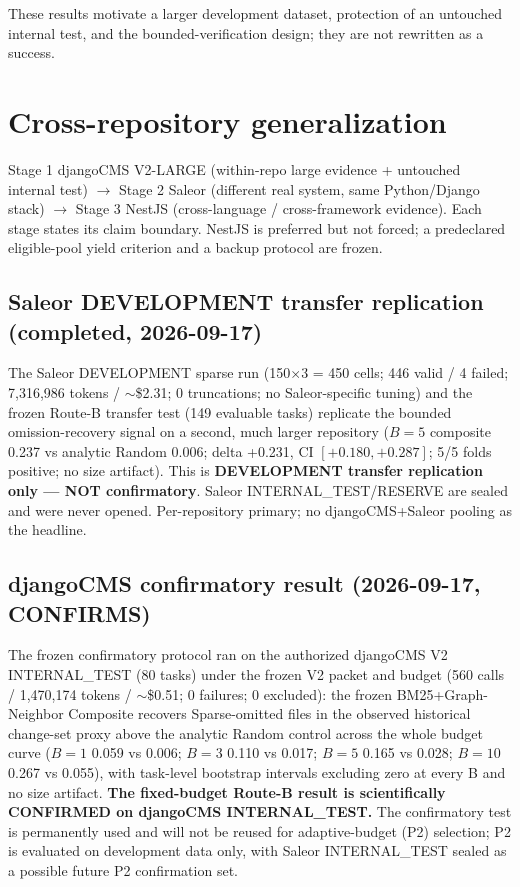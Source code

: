 \documentclass[11pt,a4paper]{article}
\begin{document}
These results motivate a larger development dataset, protection of an untouched
internal test, and the bounded-verification design; they are not rewritten as a
success.

\section{Cross-repository generalization}
\label{sec:gen}

Stage 1 djangoCMS V2-LARGE (within-repo large evidence + untouched internal
test) $\to$ Stage 2 Saleor (different real system, same Python/Django stack)
$\to$ Stage 3 NestJS (cross-language / cross-framework evidence). Each stage
states its claim boundary. NestJS is preferred but not forced; a predeclared
eligible-pool yield criterion and a backup protocol are frozen.

\subsection{Saleor DEVELOPMENT transfer replication (completed, 2026-09-17)}
The Saleor DEVELOPMENT sparse run (150$\times$3 = 450 cells; 446 valid / 4
failed; 7,316,986 tokens / $\sim$\$2.31; 0 truncations; no Saleor-specific
tuning) and the frozen Route-B transfer test (149 evaluable tasks) replicate
the bounded omission-recovery signal on a second, much larger repository
($B{=}5$ composite 0.237 vs analytic Random 0.006; delta +0.231, CI
$[+0.180,+0.287]$; 5/5 folds positive; no size artifact). This is
\textbf{DEVELOPMENT transfer replication only --- NOT confirmatory}. Saleor
INTERNAL\_TEST/RESERVE are sealed and were never opened. Per-repository primary;
no djangoCMS+Saleor pooling as the headline.

\subsection{djangoCMS confirmatory result (2026-09-17, CONFIRMS)}
The frozen confirmatory protocol ran on the authorized djangoCMS V2
INTERNAL\_TEST (80 tasks) under the frozen V2 packet and budget (560 calls /
1,470,174 tokens / $\sim$\$0.51; 0 failures; 0 excluded): the frozen
BM25+Graph-Neighbor Composite recovers Sparse-omitted files in the observed
historical change-set proxy above the analytic Random control across the whole
budget curve
($B{=}1$ 0.059 vs 0.006; $B{=}3$ 0.110 vs 0.017; $B{=}5$ 0.165 vs 0.028;
$B{=}10$ 0.267 vs 0.055), with task-level bootstrap intervals excluding zero
at every B and no size artifact. \textbf{The fixed-budget Route-B result is
scientifically CONFIRMED on djangoCMS INTERNAL\_TEST.} The confirmatory
test is permanently used and will not be reused for adaptive-budget (P2)
selection; P2 is evaluated on development data only, with Saleor
INTERNAL\_TEST sealed as a possible future P2 confirmation set.
\end{document}
